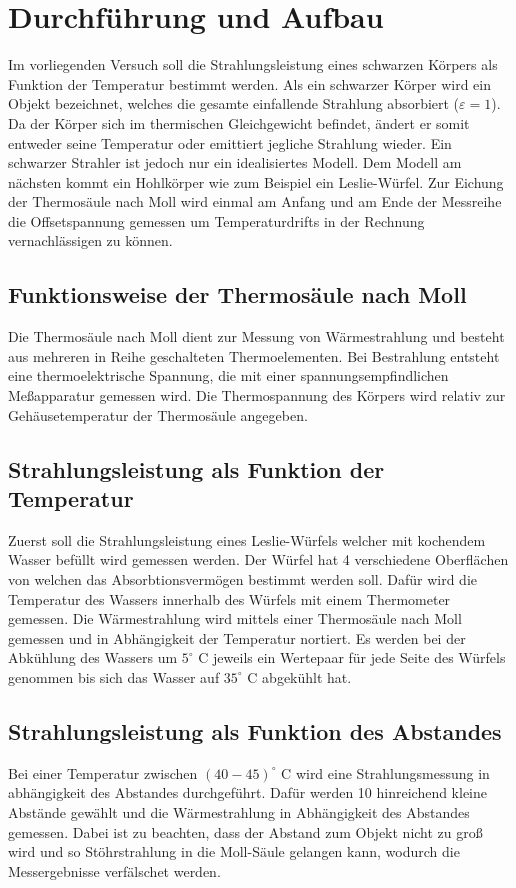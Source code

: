\section{Durchführung und Aufbau}
\label{sec:Durchführung}
Im vorliegenden Versuch soll die Strahlungsleistung eines schwarzen Körpers als Funktion der Temperatur bestimmt werden. Als ein schwarzer Körper wird ein Objekt bezeichnet, welches die gesamte einfallende Strahlung absorbiert ($\varepsilon = 1$). Da der Körper sich im thermischen Gleichgewicht befindet, ändert er somit entweder seine Temperatur oder emittiert jegliche Strahlung wieder. Ein schwarzer Strahler ist jedoch nur ein idealisiertes Modell. Dem Modell am nächsten kommt ein Hohlkörper wie zum Beispiel ein Leslie-Würfel. Zur Eichung der Thermosäule nach Moll wird einmal am Anfang und am Ende der Messreihe die Offsetspannung gemessen um Temperaturdrifts in der Rechnung vernachlässigen zu können.
\subsection{Funktionsweise der Thermosäule nach Moll}
Die Thermosäule nach Moll dient zur Messung von Wärmestrahlung und besteht aus mehreren in Reihe geschalteten Thermoelementen. Bei Bestrahlung entsteht eine thermoelektrische Spannung, die mit einer spannungsempfindlichen Meßapparatur gemessen wird. Die Thermospannung des Körpers wird relativ zur Gehäusetemperatur der Thermosäule angegeben.
\subsection{Strahlungsleistung als Funktion der Temperatur}
Zuerst soll die Strahlungsleistung eines Leslie-Würfels welcher mit kochendem Wasser befüllt wird gemessen werden. Der Würfel hat 4 verschiedene Oberflächen von welchen das Absorbtionsvermögen bestimmt werden soll. Dafür wird die Temperatur des Wassers innerhalb des Würfels mit einem Thermometer gemessen. Die Wärmestrahlung wird mittels einer Thermosäule nach Moll gemessen und in Abhängigkeit der Temperatur nortiert. Es werden bei der Abkühlung des Wassers um $5^\circ$ C jeweils ein Wertepaar für jede Seite des Würfels genommen bis sich das Wasser auf $35^\circ$ C abgekühlt hat.
\subsection{Strahlungsleistung als Funktion des Abstandes}
Bei einer Temperatur zwischen $(40 - 45) ^\circ$ C wird eine Strahlungsmessung in abhängigkeit des Abstandes durchgeführt. Dafür werden 10 hinreichend kleine Abstände gewählt und die Wärmestrahlung in Abhängigkeit des Abstandes gemessen. Dabei ist zu beachten, dass der Abstand zum Objekt nicht zu groß wird und so Stöhrstrahlung in die Moll-Säule gelangen kann, wodurch die Messergebnisse verfälschet werden.
\newpage
